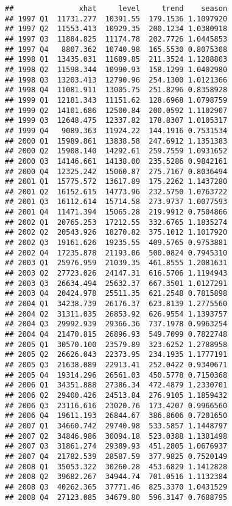 \documentclass[
]{article}
\begin{document}
\begin{verbatim}
##               xhat     level     trend    season
## 1997 Q1  11731.277  10391.55  179.1536 1.1097920
## 1997 Q2  11553.413  10929.35  200.1234 1.0380918
## 1997 Q3  11884.825  11174.78  202.7726 1.0445853
## 1997 Q4   8807.362  10740.98  165.5530 0.8075308
## 1998 Q1  13435.031  11689.85  211.3524 1.1288803
## 1998 Q2  11598.344  10990.93  158.1299 1.0402980
## 1998 Q3  13203.413  12790.96  254.1300 1.0121366
## 1998 Q4  11081.911  13005.75  251.8296 0.8358928
## 1999 Q1  12181.343  11151.62  128.6968 1.0798759
## 1999 Q2  14101.686  12500.84  200.0592 1.1102907
## 1999 Q3  12648.475  12337.82  178.8307 1.0105317
## 1999 Q4   9089.363  11924.22  144.1916 0.7531534
## 2000 Q1  15989.861  13838.58  247.6912 1.1351383
## 2000 Q2  15908.140  14292.61  259.7559 1.0931652
## 2000 Q3  14146.661  14138.00  235.5286 0.9842161
## 2000 Q4  12325.242  15060.87  275.7167 0.8036494
## 2001 Q1  15775.572  13617.89  175.2262 1.1437280
## 2001 Q2  16152.615  14773.96  232.5750 1.0763722
## 2001 Q3  16112.614  15714.58  273.9737 1.0077593
## 2001 Q4  11471.394  15065.28  219.9912 0.7504866
## 2002 Q1  20765.253  17212.55  332.6765 1.1835274
## 2002 Q2  20543.926  18270.82  375.1012 1.1017920
## 2002 Q3  19161.626  19235.55  409.5765 0.9753881
## 2002 Q4  17235.878  21193.06  500.0824 0.7945310
## 2003 Q1  25976.959  21039.35  461.8555 1.2081631
## 2003 Q2  27723.026  24147.31  616.5706 1.1194943
## 2003 Q3  26634.494  25632.37  667.3501 1.0127291
## 2003 Q4  20424.978  25511.35  621.2548 0.7815898
## 2004 Q1  34238.739  26176.37  623.8139 1.2775560
## 2004 Q2  31311.035  26853.92  626.9554 1.1393757
## 2004 Q3  29992.939  29366.36  737.1978 0.9963254
## 2004 Q4  21470.815  26896.93  549.7099 0.7822748
## 2005 Q1  30570.100  23579.89  323.6252 1.2788958
## 2005 Q2  26626.043  22373.95  234.1935 1.1777191
## 2005 Q3  21638.089  22913.41  252.0422 0.9340671
## 2005 Q4  19314.296  26561.03  450.5778 0.7150368
## 2006 Q1  34351.888  27386.34  472.4879 1.2330701
## 2006 Q2  29400.426  24513.84  276.9105 1.1859432
## 2006 Q3  23116.616  23020.76  173.4207 0.9966560
## 2006 Q4  19611.193  26844.67  386.8606 0.7201650
## 2007 Q1  34660.742  29740.98  533.5857 1.1448797
## 2007 Q2  34846.986  30094.18  523.0388 1.1381498
## 2007 Q3  31861.274  29389.93  451.2805 1.0676937
## 2007 Q4  21782.539  28587.59  377.9825 0.7520149
## 2008 Q1  35053.322  30260.28  453.6829 1.1412828
## 2008 Q2  39682.267  34944.74  701.0516 1.1132384
## 2008 Q3  40262.365  37771.46  825.3370 1.0431529
## 2008 Q4  27123.085  34679.80  596.3147 0.7688795

\end{verbatim}
\end{document}
